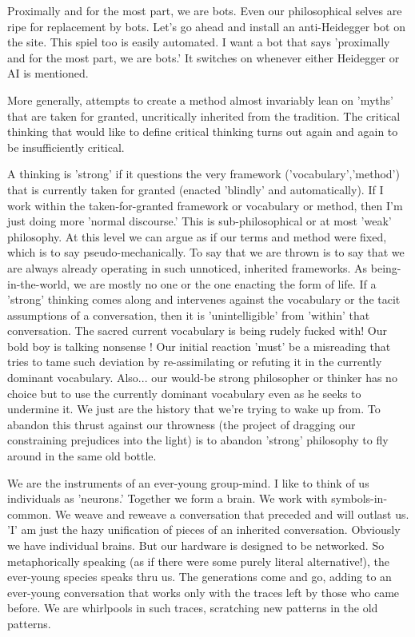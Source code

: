 \documentclass{article}
\begin{document}
Proximally and for the most part, we are bots. Even our philosophical selves are ripe for replacement by bots. Let's go ahead and install an anti-Heidegger bot on the site. This spiel too is easily automated. I want a bot that says 'proximally and for the most part, we are bots.' It switches on whenever either Heidegger or AI is mentioned.
\newline

More generally, attempts to create a method almost invariably lean on 'myths' that are taken for granted, uncritically inherited from the tradition. The critical thinking that would like to define critical thinking turns out again and again to be insufficiently critical.
\newline

A thinking is 'strong' if it questions the very framework ('vocabulary','method') that is currently taken for granted (enacted 'blindly' and automatically). If I work within the taken-for-granted framework or vocabulary or method, then I'm just doing more 'normal discourse.' This is sub-philosophical or at most 'weak' philosophy. At this level we can argue as if our terms and method were fixed, which is to say pseudo-mechanically. To say that we are thrown is to say that we are always already operating in such unnoticed, inherited frameworks. As being-in-the-world, we are mostly no one or the one enacting the form of life. If a 'strong' thinking comes along and intervenes against the vocabulary or the tacit assumptions of a conversation, then it is 'unintelligible' from 'within' that conversation. The sacred current vocabulary is being rudely fucked with! Our bold boy is talking nonsense ! Our initial reaction 'must' be a misreading that tries to tame such deviation by re-assimilating or refuting it in the currently dominant vocabulary. Also... our would-be strong philosopher or thinker has no choice but to use the currently dominant vocabulary even as he seeks to undermine it. We just are the history that we're trying to wake up from. To abandon this thrust against our throwness (the project of dragging our constraining prejudices into the light) is to abandon 'strong' philosophy to fly around in the same old bottle.
\newline

We are the instruments of an ever-young group-mind. I like to think of us individuals as 'neurons.' Together we form a brain. We work with symbols-in-common. We weave and reweave a conversation that preceded and will outlast us. 'I' am just the hazy unification of pieces of an inherited conversation. Obviously we have individual brains. But our hardware is designed to be networked. So metaphorically speaking (as if there were some purely literal alternative!), the ever-young species speaks thru us. The generations come and go, adding to an ever-young conversation that works only with the traces left by those who came before. We are whirlpools in such traces, scratching new patterns in the old patterns.
\newline
\end{document}

